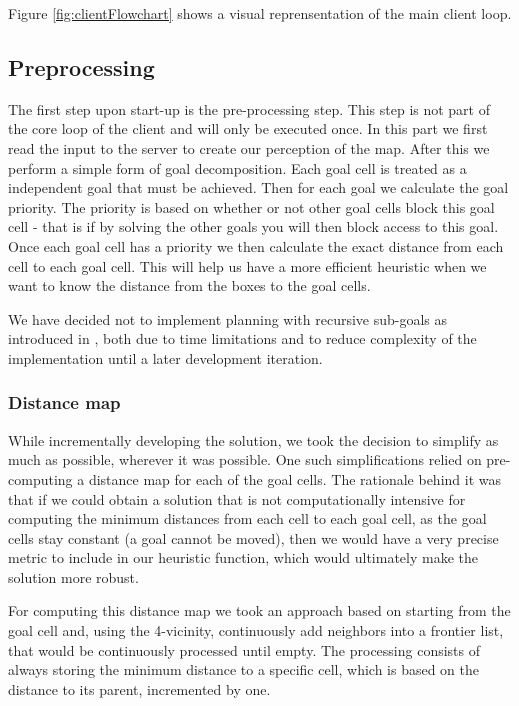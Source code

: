 \documentclass[letterpaper]{article}
\begin{document}
Figure \ref{fig:clientFlowchart} shows a visual reprensentation of the main client loop.

\subsection{Preprocessing}
The first step upon start-up is the pre-processing step. This step is not part of the core loop of the client and will only be executed once. In this part we first read the input to the server to create our perception of the map. After this we perform a simple form of goal decomposition. Each goal cell is treated as a independent goal that must be achieved. Then for each goal we calculate the goal priority. The priority is based on whether or not other goal cells block this goal cell - that is if by solving the other goals you will then block access to this goal. Once each goal cell has a priority we then calculate the exact distance from each cell to each goal cell. This will help us have a more efficient heuristic when we want to know the distance from the boxes to the goal cells.

We have decided not to implement planning with recursive sub-goals as introduced in \cite{recursiveSubgoals}, both due to time limitations and to reduce complexity of the implementation until a later development iteration.

\subsubsection{Distance map}

While incrementally developing the solution, we took the decision to simplify as much as possible, wherever it was possible. One such simplifications relied on pre-computing a distance map for each of the goal cells. The rationale behind it was that if we could obtain a solution that is not computationally intensive for computing the minimum distances from each cell to each goal cell, as the goal cells stay constant (a goal cannot be moved), then we would have a very precise metric to include in our heuristic function, which would ultimately make the solution more robust.

For computing this distance map we took an approach based on starting from the goal cell and, using the 4-vicinity, continuously add neighbors into a frontier list, that would be continuously processed until empty. The processing consists of always storing the minimum distance to a specific cell, which is based on the distance to its parent, incremented by one.
\end{document}
